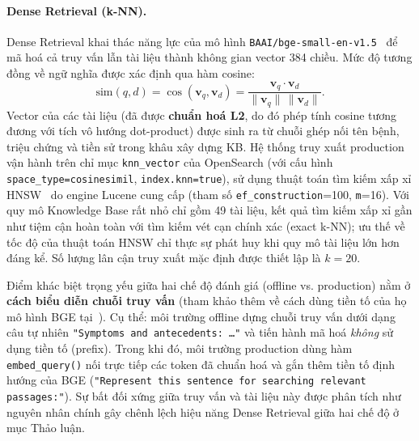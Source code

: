 \paragraph{Dense Retrieval (k-NN).}
Dense Retrieval khai thác năng lực của mô hình \texttt{BAAI/bge-small-en-v1.5}~\cite{xiao2024cpack} để mã hoá cả truy vấn lẫn tài liệu thành không gian vector 384 chiều. Mức độ tương đồng về ngữ nghĩa được xác định qua hàm cosine:
\begin{equation}
    \mathrm{sim}(q,d)=\cos(\mathbf{v}_q,\mathbf{v}_d)
    =\frac{\mathbf{v}_q\cdot\mathbf{v}_d}
    {\lVert\mathbf{v}_q\rVert\,\lVert\mathbf{v}_d\rVert}.
\end{equation}
Vector của các tài liệu (đã được \textbf{chuẩn hoá L2}, do đó phép tính cosine tương đương với tích vô hướng dot-product) được sinh ra từ chuỗi ghép nối tên bệnh, triệu chứng và tiền sử trong khâu xây dựng KB. Hệ thống truy xuất production vận hành trên chỉ mục \texttt{knn\_vector} của OpenSearch (với cấu hình \texttt{space\_type=cosinesimil}, \texttt{index.knn=true}), sử dụng thuật toán tìm kiếm xấp xỉ HNSW~\cite{malkov2018hnsw} do engine Lucene cung cấp (tham số \texttt{ef\_construction}=100, \texttt{m}=16). Với quy mô Knowledge Base rất nhỏ chỉ gồm 49 tài liệu, kết quả tìm kiếm xấp xỉ gần như tiệm cận hoàn toàn với tìm kiếm vét cạn chính xác (exact k-NN); ưu thế về tốc độ của thuật toán HNSW chỉ thực sự phát huy khi quy mô tài liệu lớn hơn đáng kể. Số lượng lân cận truy xuất mặc định được thiết lập là $k=20$.

Điểm khác biệt trọng yếu giữa hai chế độ đánh giá (offline vs. production) nằm ở \textbf{cách biểu diễn chuỗi truy vấn} (tham khảo thêm về cách dùng tiền tố của họ mô hình BGE tại~\cite{xiao2024cpack}). Cụ thể: môi trường offline dựng chuỗi truy vấn dưới dạng câu tự nhiên \texttt{"Symptoms and antecedents: \dots"} và tiến hành mã hoá \textit{không} sử dụng tiền tố (prefix). Trong khi đó, môi trường production dùng hàm \texttt{embed\_query()} nối trực tiếp các token đã chuẩn hoá và gắn thêm tiền tố định hướng của BGE (\texttt{"Represent this sentence for searching relevant passages:"}). Sự bất đối xứng giữa truy vấn và tài liệu này được phân tích như nguyên nhân chính gây chênh lệch hiệu năng Dense Retrieval giữa hai chế độ ở mục Thảo luận.

